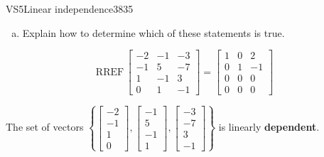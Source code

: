 \begin{exercise}{VS5}{Linear independence}{3835}
\begin{exerciseStatement}
\begin{enumerate}[(a)]
     
\item  

 Explain how to determine which of these statements is true. 

 
\end{enumerate}

     \end{exerciseStatement}
 \begin{exerciseAnswer} 

 \[
\mathrm{RREF}\, \left[\begin{array}{ccc}
-2 & -1 & -3 \\
-1 & 5 & -7 \\
1 & -1 & 3 \\
0 & 1 & -1
\end{array}\right] = \left[\begin{array}{ccc}
1 & 0 & 2 \\
0 & 1 & -1 \\
0 & 0 & 0 \\
0 & 0 & 0
\end{array}\right]
            \] 

 

 The set of vectors \(\left\{ \left[\begin{array}{c}
-2 \\
-1 \\
1 \\
0
\end{array}\right] , \left[\begin{array}{c}
-1 \\
5 \\
-1 \\
1
\end{array}\right] , \left[\begin{array}{c}
-3 \\
-7 \\
3 \\
-1
\end{array}\right] \right\}\) is linearly \textbf{dependent}. 

 \end{exerciseAnswer}
 \end{exercise}


